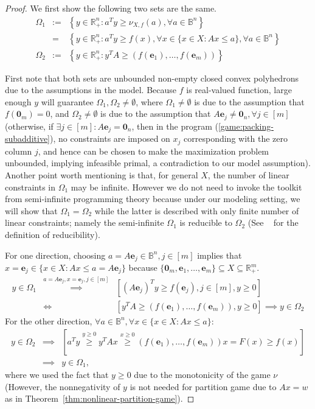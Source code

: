 \documentclass[11pt]{article}\usepackage[]{graphicx}\usepackage[]{xcolor}
\begin{document}
\begin{proof} 
We first show the following two sets are the same. 
\begin{eqnarray*}
\Omega_1&:=&\left\{y\in\mathbb{R}^n_{+}: a^Ty\ge \nu_{X, f}(a), \forall a\in\mathbb{B}^n\right\}\\
&=&\left\{y\in\mathbb{R}^n_{+}: a^Ty\ge f(x), \forall x\in \{x\in X: Ax\le a\}, \forall a\in \mathbb{B}^n\right\}\\
\Omega_2&:=&\left\{y\in\mathbb{R}^n_{+}: y^TA\ge (f(\mathbf{e}_1),\dots, f(\mathbf{e}_m))\right\}
\end{eqnarray*}

First note that both sets are unbounded non-empty closed convex polyhedrons due to the assumptions in the model. Because $f$ is real-valued function, large enough $y$ will guarantee $\Omega_1, \Omega_2\ne \emptyset$, where $\Omega_1 \ne \emptyset$ is due to the assumption that $f\left(\mathbf{0}_m\right)=0$, and $\Omega_2 \ne \emptyset$ is due to the assumption that $A\mathbf{e}_j\ne \mathbf{0}_n, \forall j\in [m]$ (otherwise, if $\exists j\in [m]: A\mathbf{e}_j=\mathbf{0}_n$, then in the program (\ref{game:packing-subadditive}), no constraints are imposed on $x_j$ corresponding with the zero column $j$, and hence can be chosen to make the maximization problem unbounded, implying infeasible primal, a contradiction to our model assumption). Another point worth mentioning is that, for general $X$, the number of linear constraints in $\Omega_1$ may be infinite. However we do not need to invoke the toolkit from semi-infinite programming theory because under our modeling setting, we will show that $\Omega_1=\Omega_2$ while the latter is described with only finite number of linear constraints; namely the semi-infinite $\Omega_1$ is reducible to $\Omega_2$ (See ~\citep[Section 3; Definition 3.1]{shapiro2009semi} for the definition of reducibility).

For one direction, choosing $a=A\mathbf{e}_j\in \mathbb{B}^n, j\in [m]$ implies that $x=\mathbf{e}_j\in \{x\in X: Ax\le a=A\mathbf{e}_j\}$ because $\{\mathbf{0}_m, \mathbf{e}_1,\dots, \mathbf{e}_m\}\subseteq X\subseteq \mathbb{R}^m_{+}$.
\begin{eqnarray*}
y\in \Omega_1&\overset{a=A\mathbf{e}_j, x=\mathbf{e}_j, j\in [m]}{\implies}& \left[ (A\mathbf{e}_j)^Ty\ge f(\mathbf{e}_j), j\in [m], y\ge 0 \right]\\
&\iff& \left[y^TA\ge (f(\mathbf{e}_1),\dots, f(\mathbf{e}_m)), y\ge 0\right] \implies y\in \Omega_2
\end{eqnarray*}
For the other direction, $\forall a\in \mathbb{B}^n, \forall x\in \{x\in X: Ax\le a\}$:
\begin{eqnarray*}
y\in \Omega_2&\implies& \left[a^Ty\overset{y\ge 0}{\ge} y^TAx\overset{x\ge 0}{\ge} (f(\mathbf{e}_1),\dots, f(\mathbf{e}_m))x=F(x) \ge f(x)\right]\\
&\implies& y\in \Omega_1,
\end{eqnarray*}
where we used the fact that $y\ge 0$ due to the monotonicity of the game $\nu$ (However, the nonnegativity of $y$ is not needed for partition game due to $Ax=w$ as in Theorem~\ref{thm:nonlinear-partition-game}). 


\end{proof}
\end{document}
